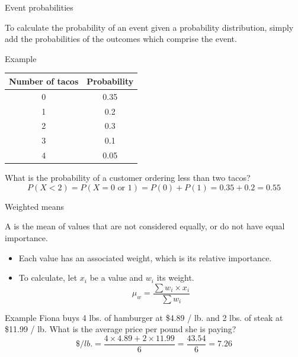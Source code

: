 \documentclass[xcolor=table]{beamer}
\begin{document}
\begin{frame}{Event probabilities}
\begin{block}{}
To calculate the probability of an event given a probability distribution, simply add the probabilities of the outcomes which comprise the event.
\end{block}
\pause
\begin{exampleblock}{Example}
{\centering \renewcommand{\arraystretch}{1}
\begin{tabular}{c | c}
Number of tacos & Probability\\
\hline
0 & 0.35\\
1 & 0.2\\
2 & 0.3\\
3 & 0.1\\
4 & 0.05
\end{tabular}\par
\renewcommand{\arraystretch}{1.5}}
\bigskip
What is the probability of a customer ordering less than two tacos?
\pause\[P(X<2) = P(X = 0 \text{ or } 1) = P(0) + P(1) = 0.35 + 0.2 = 0.55 \]
\end{exampleblock}
\end{frame}

\begin{frame}{Weighted means}
\begin{block}{}
{\large A  is the mean of values that are not considered equally, or do not have equal importance.}
\begin{itemize}
\item Each value has an associated weight, which is its relative importance.
\item To calculate, let $x_i$ be a value and $w_i$ its weight.
\[\mu_w = \frac {\sum w_i \times x_i}{\sum w_i}\]
\end{itemize}
\end{block}
\pause
\begin{exampleblock}{Example}
Fiona buys 4 lbs. of hamburger at \$4.89 / lb. and 2 lbs. of steak at \$11.99 / lb. What is the average price per pound she is paying?
\[ \$/lb. = \frac {4 \times 4.89 + 2 \times 11.99}{6} = \frac {43.54}{6} = 7.26\]
\end{exampleblock}
\end{frame}
\end{document}
